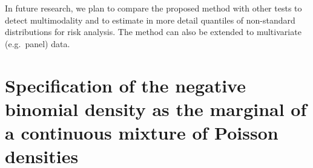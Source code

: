 \documentclass[11pt]{article}
\begin{document}
In future research, we plan to compare the proposed method with other tests to detect multimodality and to estimate in more detail quantiles of non-standard distributions for risk analysis. The method can also be extended to multivariate (e.g.\ panel) data. 


\newpage


\newpage



\appendix




\section{Specification of the negative binomial density as the marginal of a continuous mixture of Poisson densities \label{appendix:derivations} }
\end{document}
